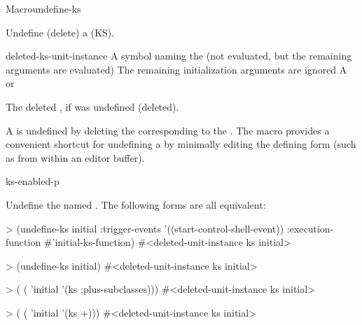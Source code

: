 \documentclass[10pt,twoside,english,pdftex]{article}
\begin{document}
\begin{functiondoc}{Macro}{undefine-ks}{
      
    \returns{} }
%
%
%

\fnsyntax

\fnpurpose Undefine (delete) a  (KS).

\fnpackage {}

\fnmodule {}

\fnargs
\begin{args}{deleted-ks-unit-instance}
\arg[ks-name] A symbol naming the  (not evaluated, but the remaining
arguments are evaluated)
 The remaining initialization arguments are ignored
 A   or \nil{}
\end{args}

\fnreturns The deleted  , if
  was undefined (deleted).

\fndescription A  is undefined by deleting the 
corresponding to the .  The  macro
provides a convenient shortcut for undefining a  by minimally
editing the defining form (such as from within an editor buffer).

\begin{alsos}{ks-enabled-p}
\also[define-ks]
\also[ks-enabled-p]
\end{alsos}

\fnexamples Undefine the  named . The following
forms are all equivalent:
%
\W\supp
\begin{example}
  > (undefine-ks initial
       :trigger-events '((start-control-shell-event)) 
       :execution-function #'initial-ks-function)
  #<deleted-unit-instance ks initial>\goodpagebreak

  > (undefine-ks initial)
  #<deleted-unit-instance ks initial>\goodpagebreak

  > ( 
       ( 'initial '(ks :plus-subclasses)))
  #<deleted-unit-instance ks initial>
  
  > ( 
       ( 'initial '(ks +)))
  #<deleted-unit-instance ks initial>

\end{example}

\end{functiondoc}
\end{document}
